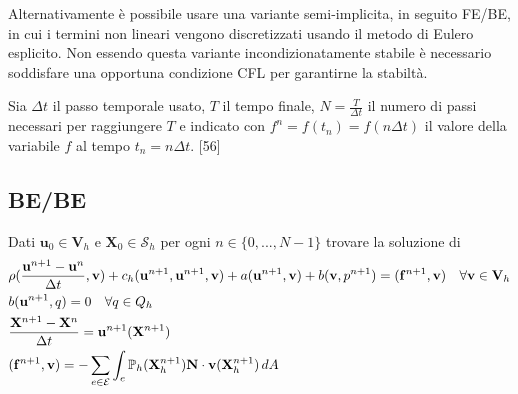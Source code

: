 Alternativamente è possibile usare una variante semi-implicita, in seguito FE/BE, in cui i termini non lineari vengono discretizzati usando il metodo di Eulero esplicito. Non essendo questa variante incondizionatamente stabile è necessario soddisfare una opportuna condizione CFL per garantirne la stabiltà.

Sia $\Delta t$ il passo temporale usato, $T$ il tempo finale, $N=\frac{T}{\Delta t}$ il numero di passi necessari per raggiungere $T$ e indicato con $f^n = f(t_n) = f(n\Delta t)$ il valore della variabile $f$ al tempo $t_n=n\Delta t$. [56]

\subsection{BE/BE}

\begin{problem}
Dati $\mathbf{u}_0\in\mathbf{V}_h$ e  $\mathbf{X}_0\in\mathcal{S}_h$ per ogni $n\in\{0,...,N-1\}$ trovare la soluzione di
\begin{equation}
\begin{aligned}
&\rho(\frac{\mathbf{u}^{n+1}-\mathbf{u}^{n}}{\Delta t}, \mathbf{v}) + c_h(\mathbf{u}^{n+1},\mathbf{u}^{n+1},\mathbf{v}) + a(\mathbf{u}^{n+1},\mathbf{v}) + b(\mathbf{v},p^{n+1}) = \ps{\mathbf{f}^{n+1}}{\mathbf{v}} \quad \forall\mathbf{v}\in\mathbf{V}_h\\
&b(\mathbf{u}^{n+1},q)=0 \quad \forall q\in Q_h\\
&\frac{\mathbf{X}^{n+1}-\mathbf{X}^{n}}{\Delta t} = \mathbf{u}^{n+1}(\mathbf{X}^{n+1})\\
&\ps{\mathbf{f}^{n+1}}{\mathbf{v}}=-\sum_{e\in\mathcal{E}}\int_e\mathbb{P}_h(\mathbf{X}_h^{n+1})\mathbf{N}\cdot\mathbf{v}(\mathbf{X}^{n+1}_h)\,dA\\
\end{aligned}
\end{equation}
\end{problem}


